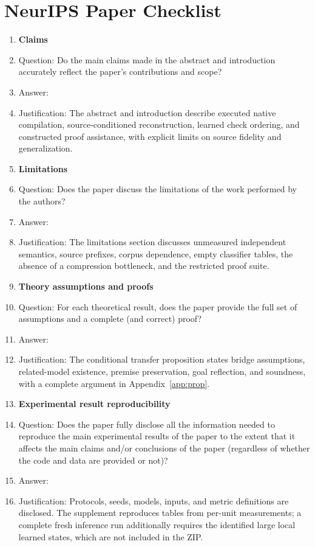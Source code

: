 \section*{NeurIPS Paper Checklist}

\begin{enumerate}

\item {\bf Claims}
    \item[] Question: Do the main claims made in the abstract and introduction accurately reflect the paper's contributions and scope?
    \item[] Answer: \answerYes{}
    \item[] Justification: The abstract and introduction describe executed native compilation, source-conditioned reconstruction, learned check ordering, and constructed proof assistance, with explicit limits on source fidelity and generalization.

\item {\bf Limitations}
    \item[] Question: Does the paper discuss the limitations of the work performed by the authors?
    \item[] Answer: \answerYes{}
    \item[] Justification: The limitations section discusses unmeasured independent semantics, source prefixes, corpus dependence, empty classifier tables, the absence of a compression bottleneck, and the restricted proof suite.

\item {\bf Theory assumptions and proofs}
    \item[] Question: For each theoretical result, does the paper provide the full set of assumptions and a complete (and correct) proof?
    \item[] Answer: \answerYes{}
    \item[] Justification: The conditional transfer proposition states bridge assumptions, related-model existence, premise preservation, goal reflection, and soundness, with a complete argument in Appendix~\ref{app:prop}.

    \item {\bf Experimental result reproducibility}
    \item[] Question: Does the paper fully disclose all the information needed to reproduce the main experimental results of the paper to the extent that it affects the main claims and/or conclusions of the paper (regardless of whether the code and data are provided or not)?
    \item[] Answer: \answerYes{}
    \item[] Justification: Protocols, seeds, models, inputs, and metric definitions are disclosed. The supplement reproduces tables from per-unit measurements; a complete fresh inference run additionally requires the identified large local learned states, which are not included in the ZIP.



\end{enumerate}
